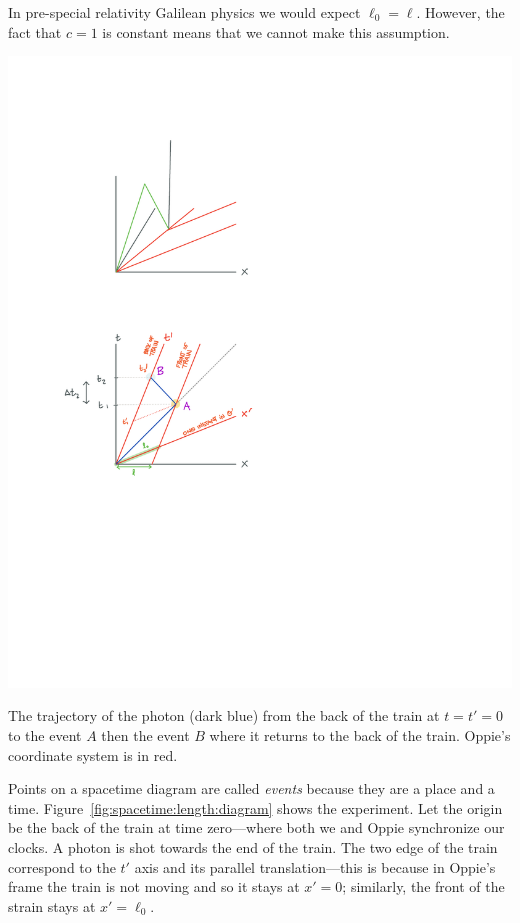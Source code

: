 \begin{subappendices}
In pre-special relativity Galilean physics we would expect $\ell_0 = \ell$. However, the fact that $c=1$ is constant means that we cannot make this assumption. 
\begin{marginfigure}%
    \includegraphics[width=\textwidth]{figures/spacetime_lengthcontraction.pdf}
    \caption{The trajectory of the photon (dark blue) from the back of the train at $t=t'=0$ to the event $A$ then the event $B$ where it returns to the back of the train. Oppie's coordinate system is in red. \label{fig:spacetime:length:diagram}}
\end{marginfigure}
Points on a spacetime diagram are called \emph{events} because they are a place and a time. Figure~\ref{fig:spacetime:length:diagram} shows the experiment. Let the origin be the back of the train at time zero---where both we and Oppie synchronize our clocks. A photon is shot towards the end of the train. The two edge of the train correspond to the $t'$ axis and its parallel translation---this is because in Oppie's frame the train is not moving and so it stays at $x'=0$; similarly, the front of the strain stays at $x'=\ell_0$. 


\end{subappendices}
